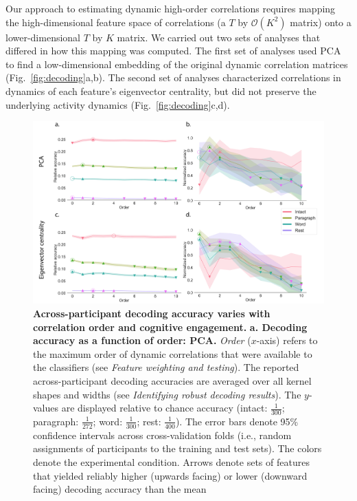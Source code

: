 \documentclass[english]{article}
\begin{document}
Our approach to estimating dynamic high-order correlations requires
mapping the high-dimensional feature space of correlations (a $T$ by
$\mathcal{O}(K^2)$ matrix) onto a lower-dimensional $T$ by $K$ matrix.
We carried out two sets of analyses that differed in how this mapping
was computed.  The first set of analyses used PCA to find a
low-dimensional embedding of the original dynamic correlation matrices
(Fig.~\ref{fig:decoding}a,b).  The second set of analyses
characterized correlations in dynamics of each feature's eigenvector
centrality, but did not preserve the underlying activity dynamics
(Fig.~\ref{fig:decoding}c,d).

\begin{figure}[tp]
  \centering
  \includegraphics[width=\textwidth]{figs/decode_level}
  \caption{\textbf{Across-participant decoding accuracy varies with
      correlation order and cognitive engagement.}
    \textbf{a. Decoding accuracy as a function of order: PCA.}
    \textit{Order} ($x$-axis) refers to the maximum order of dynamic
    correlations that were available to the classifiers (see
    \textit{Feature weighting and testing}).  The reported
    across-participant decoding accuracies are averaged over all
    kernel shapes and widths (see \textit{Identifying robust decoding
      results}).  The $y$-values are displayed relative to chance
    accuracy (intact: $\frac{1}{300}$; paragraph: $\frac{1}{272}$;
    word: $\frac{1}{300}$; rest: $\frac{1}{400}$).  The error bars
    denote 95\% confidence intervals across cross-validation folds
    (i.e., random assignments of participants to the training and test
    sets).  The colors denote the experimental condition.  Arrows
    denote sets of features that yielded reliably higher (upwards
    facing) or lower (downward facing) decoding accuracy than the mean
}
\end{figure}
\end{document}
